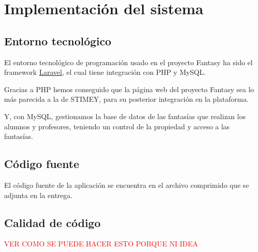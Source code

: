 \chapter{Implementación del sistema}
\section{Entorno tecnológico}
El entorno tecnológico de programación usado en el proyecto Fantasy ha sido el framework \href{https://laravel.com/}{Laravel}, el cual tiene integración con PHP y MySQL.

Gracias a PHP hemos conseguido que la página web del proyecto Fantasy sea lo más parecida a la de STIMEY, para su posterior integración en la plataforma.

Y, con MySQL, gestionamos la base de datos de las fantasías que realizan los alumnos y profesores, teniendo un control de la propiedad y acceso a las fantasías.

\section{Código fuente}
El código fuente de la aplicación se encuentra en el archivo comprimido que se adjunta en la entrega.

\section{Calidad de código}
\textcolor{red}{VER COMO SE PUEDE HACER ESTO PORQUE NI IDEA}
